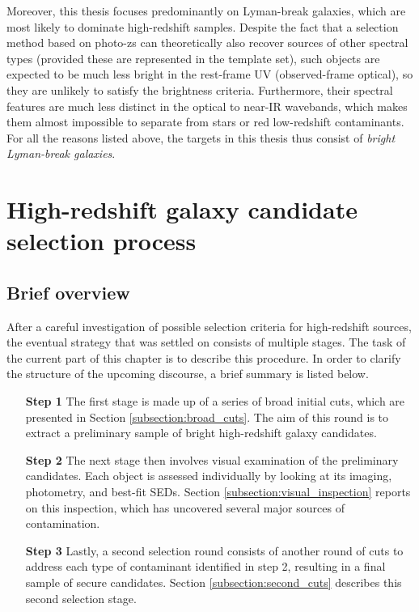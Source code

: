 Moreover, this thesis focuses predominantly on Lyman-break galaxies, which are most likely to dominate  high-redshift samples. Despite the fact that a selection method based on photo-zs can theoretically also recover sources of other spectral types (provided these are represented in the template set), such objects are expected to be much less bright in the rest-frame UV (observed-frame optical), so they are unlikely to satisfy the brightness criteria. Furthermore, their spectral features  are much less distinct in the optical to near-IR wavebands, which makes them almost impossible to separate from stars or red low-redshift contaminants. For all the reasons listed above, the targets in this thesis thus consist of \textit{bright Lyman-break galaxies}. \par 


\section{High-redshift galaxy candidate selection process}\label{section:selection_criteria}
\subsection{Brief overview}\label{subsection:brief_overview}
After a careful investigation of possible selection criteria for high-redshift sources, the eventual strategy that was settled on consists of multiple stages. The task of the current part of this chapter is to describe this procedure. In order to clarify the structure of the upcoming discourse, a brief summary is listed below.  \par 

\begin{itemize}[leftmargin=4em]
    \item[\bf Step 1] The first stage is made up of a series of broad initial cuts, which are presented in Section \ref{subsection:broad_cuts}. The aim of this round is to extract a preliminary sample of bright high-redshift galaxy candidates. 
    \item[\bf Step 2] The next stage then involves visual examination of the preliminary candidates. Each object is assessed individually by looking at its imaging, photometry, and best-fit SEDs. Section \ref{subsection:visual_inspection} reports on this inspection, which has uncovered several major sources of contamination. 
    \item[\bf Step 3] Lastly, a second selection round consists of another round of cuts to address each type of contaminant identified in step 2, resulting in a final sample of secure candidates. Section \ref{subsection:second_cuts} describes this second selection stage. 
\end{itemize}

